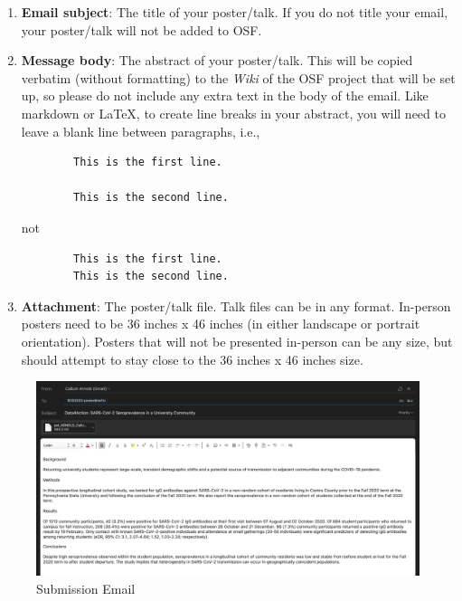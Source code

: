 \documentclass{scrartcl}
\begin{document}
\begin{enumerate}
    \item \textbf{Email subject}: The title of your poster/talk.
    If you do not title your email, your poster/talk will not be added to OSF.
    \item \textbf{Message body}: The abstract of your poster/talk.
    This will be copied verbatim (without formatting) to the \emph{Wiki} of the OSF project that will be set up, so please do not include any extra text in the body of the email.
    Like markdown or \LaTeX, to create line breaks in your abstract, you will need to leave a blank line between paragraphs, i.e., 

    \begin{verbatim}
        This is the first line.
        
        This is the second line.
    \end{verbatim}

    not

    \begin{verbatim}
        This is the first line.
        This is the second line.
    \end{verbatim}

    \item \textbf{Attachment}: The poster/talk file.
    Talk files can be in any format.
    In-person posters need to be 36 inches x 46 inches (in either landscape or portrait orientation).
    Posters that will not be presented in-person can be any size, but should attempt to stay close to the 36 inches x 46 inches size.

\end{enumerate}

\begin{figure}[!htb]
    \includegraphics[width=\textwidth]{submission-email.png}
    \caption{Submission Email}
    \label{fig:submission-email}
\end{figure}
\end{document}
